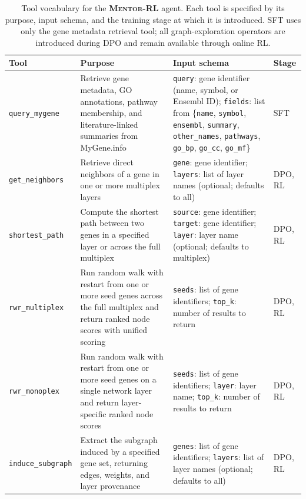 \documentclass[thesis,letterpaper,12pt]{utthesis}
\begin{document}
\begin{table}[ht]
\centering
\caption{Tool vocabulary for the \textbf{\textsc{Mentor-RL}} agent. Each tool is specified by its purpose, input schema, and the training stage at which it is introduced. SFT uses only the gene metadata retrieval tool; all graph-exploration operators are introduced during DPO and remain available through online RL.}
\label{tbl:tools}
\begin{tabularx}{\textwidth}{l Y Y l}
\toprule
\textbf{Tool} & \textbf{Purpose} & \textbf{Input schema} & \textbf{Stage} \\
\midrule
\texttt{query\_mygene} & Retrieve gene metadata, GO annotations, pathway membership, and literature-linked summaries from MyGene.info & \texttt{query}: gene identifier (name, symbol, or Ensembl ID); \texttt{fields}: list from \{\texttt{name}, \texttt{symbol}, \texttt{ensembl}, \texttt{summary}, \texttt{other\_names}, \texttt{pathways}, \texttt{go\_bp}, \texttt{go\_cc}, \texttt{go\_mf}\} & SFT \\
\midrule
\texttt{get\_neighbors} & Retrieve direct neighbors of a gene in one or more multiplex layers & \texttt{gene}: gene identifier; \texttt{layers}: list of layer names (optional; defaults to all) & DPO, RL \\
\midrule
\texttt{shortest\_path} & Compute the shortest path between two genes in a specified layer or across the full multiplex & \texttt{source}: gene identifier; \texttt{target}: gene identifier; \texttt{layer}: layer name (optional; defaults to multiplex) & DPO, RL \\
\midrule
\texttt{rwr\_multiplex} & Run random walk with restart from one or more seed genes across the full multiplex and return ranked node scores with unified scoring & \texttt{seeds}: list of gene identifiers; \texttt{top\_k}: number of results to return & DPO, RL \\
\midrule
\texttt{rwr\_monoplex} & Run random walk with restart from one or more seed genes on a single network layer and return layer-specific ranked node scores & \texttt{seeds}: list of gene identifiers; \texttt{layer}: layer name; \texttt{top\_k}: number of results to return & DPO, RL \\
\midrule
\texttt{induce\_subgraph} & Extract the subgraph induced by a specified gene set, returning edges, weights, and layer provenance & \texttt{genes}: list of gene identifiers; \texttt{layers}: list of layer names (optional; defaults to all) & DPO, RL \\
\bottomrule
\end{tabularx}
\end{table}
\end{document}
